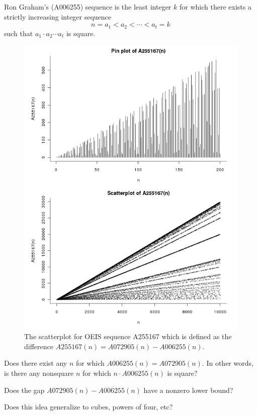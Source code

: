 \documentclass{article}
\begin{document}
Ron Graham's (A006255) sequence is the least integer $k$ for which there exists
a strictly increasing integer sequence \[
  n = a_1 < a_2 < \cdots < a_t = k
\]
such that $a_1 \cdot a_2 \cdots a_t$ is square.

\begin{figure}[!h]
  \center
  \includegraphics[trim={0cm 1cm 0cm 14cm},clip,scale=0.7]{assets/018_problem_A255167}
  \caption{The scatterplot for OEIS sequence A255167 which is defined as the
  difference \(A255167(n) = A072905(n) - A006255(n).\)}
\end{figure}

\begin{question}
  Does there exist any $n$ for which $A006255(n) = A072905(n)$. In other words,
  is there any nonsquare $n$ for which $n \cdot A006255(n)$ is square?
\end{question}

\begin{related}
  \item Does the gap $A072905(n) - A006255(n)$ have a nonzero lower bound?
  \item Does this idea generalize to cubes, powers of four, etc?
\end{related}
\end{document}
